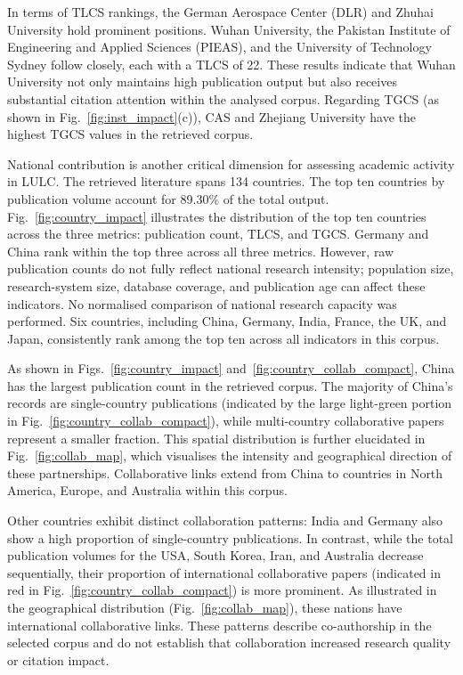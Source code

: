 \documentclass[]{interact}
\theoremstyle{plain}%
\theoremstyle{definition}
\theoremstyle{remark}
\begin{document}
In terms of TLCS rankings, the German Aerospace Center (DLR) and Zhuhai University hold prominent positions. Wuhan University, the Pakistan Institute of Engineering and Applied Sciences (PIEAS), and the University of Technology Sydney follow closely, each with a TLCS of 22. These results indicate that Wuhan University not only maintains high publication output but also receives substantial citation attention within the analysed corpus. Regarding TGCS (as shown in Fig.~\ref{fig:inst_impact}(c)), CAS and Zhejiang University have the highest TGCS values in the retrieved corpus. 


National contribution is another critical dimension for assessing academic activity in LULC. The retrieved literature spans 134 countries. The top ten countries by publication volume account for 89.30\% of the total output. Fig.~\ref{fig:country_impact} illustrates the distribution of the top ten countries across the three metrics: publication count, TLCS, and TGCS. Germany and China rank within the top three across all three metrics. However, raw publication counts do not fully reflect national research intensity; population size, research-system size, database coverage, and publication age can affect these indicators. No normalised comparison of national research capacity was performed. Six countries, including China, Germany, India, France, the UK, and Japan, consistently rank among the top ten across all indicators in this corpus. 


As shown in Figs.~\ref{fig:country_impact} and~\ref{fig:country_collab_compact}, China has the largest publication count in the retrieved corpus. The majority of China's records are single-country publications (indicated by the large light-green portion in Fig.~\ref{fig:country_collab_compact}), while multi-country collaborative papers represent a smaller fraction. This spatial distribution is further elucidated in Fig.~\ref{fig:collab_map}, which visualises the intensity and geographical direction of these partnerships. Collaborative links extend from China to countries in North America, Europe, and Australia within this corpus.

Other countries exhibit distinct collaboration patterns: India and Germany also show a high proportion of single-country publications. In contrast, while the total publication volumes for the USA, South Korea, Iran, and Australia decrease sequentially, their proportion of international collaborative papers (indicated in red in Fig.~\ref{fig:country_collab_compact}) is more prominent. As illustrated in the geographical distribution (Fig.~\ref{fig:collab_map}), these nations have international collaborative links. These patterns describe co-authorship in the selected corpus and do not establish that collaboration increased research quality or citation impact.
\end{document}
